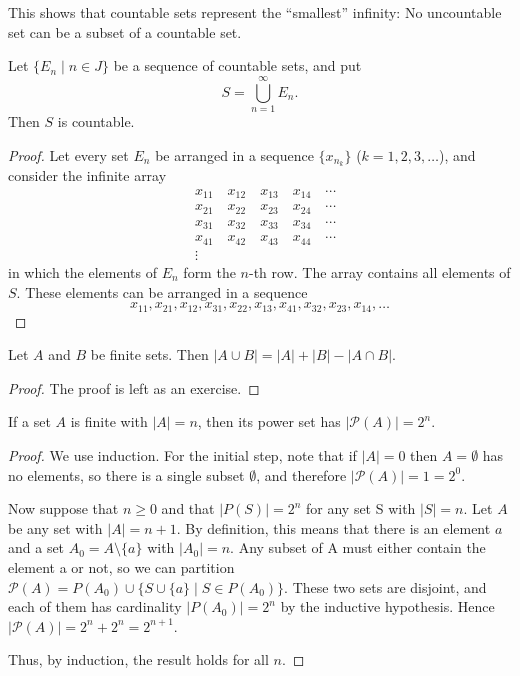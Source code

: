 This shows that countable sets represent the ``smallest'' infinity: No uncountable set can be a subset of a countable set.

\begin{proposition}
Let $\{E_n\mid n\in J\}$ be a sequence of countable sets, and put
\[S=\bigcup_{n=1}^\infty E_n.\]
Then $S$ is countable.
\end{proposition}

\begin{proof}
Let every set $E_n$ be arranged in a sequence $\{x_{n_k}\}$ ($k=1,2,3,\dots$), and consider the infinite array
\begin{align*}
&x_{11}\quad x_{12}\quad x_{13}\quad x_{14}\quad\cdots\\
&x_{21}\quad x_{22}\quad x_{23}\quad x_{24}\quad\cdots\\
&x_{31}\quad x_{32}\quad x_{33}\quad x_{34}\quad\cdots\\
&x_{41}\quad x_{42}\quad x_{43}\quad x_{44}\quad\cdots\\
&\vdots
\end{align*}
in which the elements of $E_n$ form the $n$-th row. The array contains all elements of $S$. These elements can be arranged in a sequence
\[x_{11},x_{21},x_{12},x_{31},x_{22},x_{13},x_{41},x_{32},x_{23},x_{14},\dots\]

\end{proof}

\begin{proposition}
Let $A$ and $B$ be finite sets. Then $|A \cup B| = |A| + |B| - |A \cap B|$.
\end{proposition}

\begin{proof}
The proof is left as an exercise.
\end{proof}

\begin{proposition}
If a set $A$ is finite with $|A| = n$, then its power set has $|\mathcal{P}(A)| = 2^n$.
\end{proposition}

\begin{proof}
We use induction. For the initial step, note that if $|A| = 0$ then $A = \emptyset$ has no elements, so there is a single subset $\emptyset$, and therefore $|\mathcal{P}(A)| = 1 = 2^0$.

Now suppose that $n \ge 0$ and that $|P(S)| = 2^n$ for any set S with $|S| = n$. Let $A$ be any set with $|A| = n+1$. By definition, this means that there is an element $a$ and a set $A_0 = A\setminus\{a\}$ with $|A_0| = n$. Any subset of A must either contain the element a or not, so we can partition $\mathcal{P}(A) = P(A_0) \cup \{S \cup \{a\} \mid S \in P(A_0)\}$. These two sets are disjoint, and each of them has cardinality $|P(A_0)| = 2^n$ by the inductive hypothesis. Hence $|\mathcal{P}(A)| = 2^n + 2^n = 2^{n+1}$.

Thus, by induction, the result holds for all $n$.
\end{proof}

